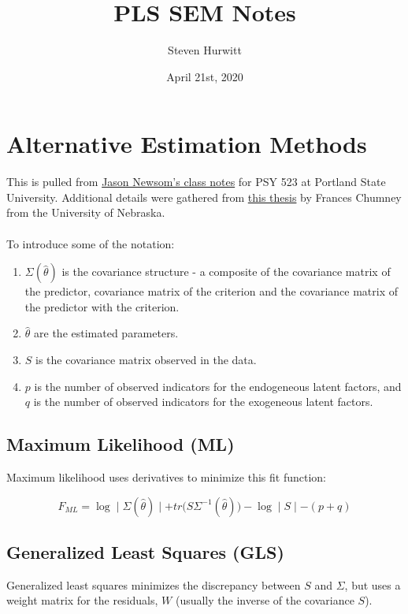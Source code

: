 \documentclass{article}
\title{PLS SEM Notes}
\author{Steven Hurwitt}
\date{April 21st, 2020}
\begin{document}
\maketitle

\section{Alternative Estimation Methods}

This is pulled from \href{http://web.pdx.edu/~newsomj/semclass/ho_estimate.pdf}{Jason Newsom's class notes} for PSY 523 at Portland State University. Additional details were gathered from \href{https://digitalcommons.unl.edu/cgi/viewcontent.cgi?article=1146&context=cehsdiss}{this thesis} by Frances Chumney from the University of Nebraska.

\paragraph{}
To introduce some of the notation:

\begin{enumerate}
\item $\Sigma (\hat{\theta})$ is the covariance structure - a composite of the covariance matrix of the predictor, covariance matrix of the criterion and the covariance matrix of the predictor with the criterion.

\item $\hat{\theta}$ are the estimated parameters.

\item $S$ is the covariance matrix observed in the data.

\item $p$ is the number of observed indicators for the endogeneous latent factors, and $q$ is the number of observed indicators for the exogeneous latent factors.
\end{enumerate}

\subsection{Maximum Likelihood (ML)}
Maximum likelihood uses derivatives to minimize this fit function:

$$ F_{ML} = \log \mid \Sigma (\hat{\theta}) \mid + tr \big( S \Sigma^{-1} (\hat{\theta}) \big) - \log \mid S \mid - (p + q)$$

\subsection{Generalized Least Squares (GLS)}
Generalized least squares minimizes the discrepancy between $S$ and $\Sigma$, but uses a weight matrix for the residuals, $W$ (usually the inverse of the covariance $S$).
\end{document}
